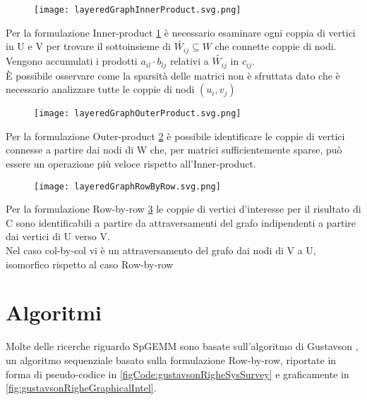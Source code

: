 \begin{figure}[h]
  \centering \texttt{[image: layeredGraphInnerProduct.svg.png]} 
  \caption[Rappresentazione grafica del calcolo di $c_{i,j}$ mediante Inner-product]
  \decoRule \label{fig:layeredGraphInnerProduct}
\end{figure}
Per la formulazione Inner-product \ref{fig:layeredGraphInnerProduct} 
è necessario esaminare ogni coppia di vertici  in U e V per trovare 
il sottoinsieme di $\tilde{W_{ij}} \subseteq W$ che connette coppie di nodi. \\
Vengono accumulati i prodotti $a_{il} \cdot b_{lj}$ relativi a $\tilde{W_{ij}}$ in $c_{ij}$.\\
È possibile osservare come la sparsità delle matrici non è sfruttata dato
che è necessario analizzare tutte le coppie di nodi $(u_i,v_j)$\\
\begin{figure}[h]
  \centering \texttt{[image: layeredGraphOuterProduct.svg.png]} 
  \caption[Rappresentazione grafica della componente $a_{*i} \cdot b_{i*}$ del calcolo di C mediante Outer-product]
  \decoRule \label{fig:layeredGraphOuterProduct}
\end{figure}
Per la formulazione Outer-product \ref{fig:layeredGraphOuterProduct}
è possibile identificare le coppie di vertici connesse a
partire dai nodi di W che, per matrici sufficientemente sparse,
può essere un operazione più veloce rispetto all'Inner-product.\\
\begin{figure}[h]
  \centering \texttt{[image: layeredGraphRowByRow.svg.png]} 
  \caption[Rappresentazione grafica della componente $a_{i*} \cdot B$ del 
     calcolo di C mediante formulazione row-by-row]
  \decoRule \label{fig:layeredGraphRowByRow}
  
\end{figure}
Per la formulazione Row-by-row \ref{fig:layeredGraphRowByRow}
le coppie di vertici d'interesse per il risultato di C sono identificabili 
a partire da attraversamenti del grafo indipendenti a partire dai vertici di U verso V.\\
Nel caso col-by-col vi è un attraversamento del grafo dai nodi di V a U, 
isomorfico rispetto al caso Row-by-row\\



\section{Algoritmi}
Molte delle ricerche riguardo SpGEMM sono basate sull'algoritmo di Gustavson \parencite{gustavson},
un algoritmo sequenziale basato sulla formulazione Row-by-row, riportate in forma di pseudo-codice 
in \ref{figCode:gustavsonRigheSysSurvey} e graficamente in \ref{fig:gustavsonRigheGraphicalIntel}.\\

